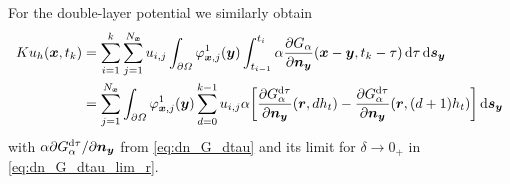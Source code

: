 \documentclass[a4paper,11pt]{article}
\begin{document}
For the double-layer potential we similarly obtain
\begin{align*}
  Ku_h({{\bm{x}}}, t_k) &= \sum_{i=1}^{k} \sum_{j=1}^{N_{{\bm{x}}}} u_{i,j} \int_{\partial\Omega} \varphi^1_{{{\bm{x}}},j}({{\bm{y}}}) \int_{t_{i-1}}^{t_i} \alpha \frac{\partial G_\alpha}{\partial {\ensuremath{{\bm{n}}}}_{{\bm{y}}}}({{\bm{x}}}-{{\bm{y}}},t_k-\tau) \,{\mathrm{d}}\tau \,{\mathrm{d}}{{\bm{s}}}_{{\bm{y}}} \\
  &= \sum_{j=1}^{N_{{\bm{x}}}} \int_{\partial\Omega} \varphi^1_{{{\bm{x}}},j}({{\bm{y}}}) \sum_{d=0}^{k-1} u_{i,j} \alpha \bigg[ \frac{\partial G_\alpha^{{\mathrm{d}}\tau}}{\partial {\ensuremath{{\bm{n}}}}_{{\bm{y}}}}({{\bm{r}}}, dh_t) - \frac{\partial G_\alpha^{{\mathrm{d}}\tau}}{\partial {\ensuremath{{\bm{n}}}}_{{\bm{y}}}}({{\bm{r}}}, (d+1)h_t) \bigg] \,{\mathrm{d}}{{\bm{s}}}_{{\bm{y}}}
\end{align*}
with $\alpha\partial G_\alpha^{{\mathrm{d}}\tau} / \partial {\ensuremath{{\bm{n}}}}_{{\bm{y}}}$ from \eqref{eq:dn_G_dtau} and its limit for $\delta \to 0_+$ in \eqref{eq:dn_G_dtau_lim_r}.

\newpage


\end{document}
